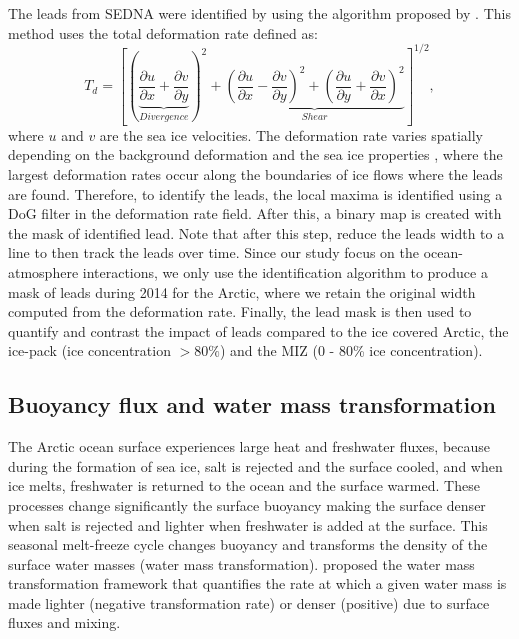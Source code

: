 \documentclass[draft]{agujournal2019}
\begin{document}
The leads from SEDNA were identified by using the algorithm proposed by \citet{Hutter_identification_2019}. This method uses the total deformation rate defined as: 
\begin{equation}
    T_d = \left[\left(\underbrace{\frac{\partial u}{\partial x} +\frac{\partial v}{\partial y}}_{Divergence}\right)^2 + \underbrace{\left(\frac{\partial u}{\partial x} - \frac{\partial v}{\partial y}\right)^2+ \left(\frac{\partial u}{\partial y} + \frac{\partial v}{\partial x}\right)^2}_{Shear}\right]^{1/2},
\end{equation}
where $u$ and $v$ are the sea ice velocities. The deformation rate varies spatially depending on the background deformation and the sea ice properties \citep{Reiser_LKF_2020}, where the largest deformation rates occur along the boundaries of ice flows where the leads are found. Therefore, to identify the leads, the local maxima is identified using a DoG filter in the deformation rate field. After this, a binary map is created with the mask of identified lead. Note that after this step, \citet{Hutter_identification_2019} reduce the leads width to a line to then track the leads over time. Since our study focus on the ocean-atmosphere interactions, we only use the identification algorithm to produce a mask of leads during 2014 for the Arctic, where we retain the original width computed from the deformation rate. Finally, the lead mask is then used to quantify and contrast the impact of leads compared to the ice covered Arctic, the ice-pack (ice concentration $> 80\%$) and the MIZ (0 - 80\% ice concentration).

\subsection*{Buoyancy flux and water mass transformation}
 
The Arctic ocean surface experiences large heat and freshwater fluxes, because during the formation of sea ice, salt is rejected and the surface cooled, and when ice melts, freshwater is returned to the ocean and the surface warmed. 
These processes change significantly the surface buoyancy making the surface denser when salt is rejected and lighter when freshwater is added at the surface. This seasonal melt-freeze cycle changes buoyancy and transforms the density of the surface water masses (water mass transformation). \citet{Walin_WMT_1982} proposed the water mass transformation framework that quantifies the rate at which a given water mass is made lighter (negative transformation rate) or denser (positive) due to surface fluxes and mixing. 
\end{document}
